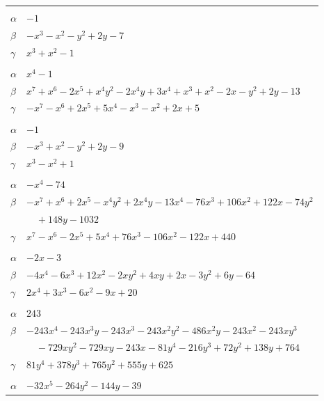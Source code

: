 \documentclass[11pt]{article}
\begin{document}
\begin{longtable}{@{}ll@{}}
\addlinespace[3pt]
\multicolumn{2}{@{}l}{$\{i,j\}=\{9,35\}$, $k_{ij}=2\cdot 7$}\\
$\alpha$ & $-1$\\
$\beta$ & $-x^{3}-x^{2}-y^{2}+2y-7$\\
$\gamma$ & $x^{3}+x^{2}-1$\\
\addlinespace[3pt]
\multicolumn{2}{@{}l}{$\{i,j\}=\{9,36\}$, $k_{ij}=2\cdot 3\cdot 5$}\\
$\alpha$ & $x^{4}-1$\\
$\beta$ & $x^{7}+x^{6}-2x^{5}+x^{4}y^{2}-2x^{4}y+3x^{4}+x^{3}+x^{2}-2x-y^{2}+2y-13$\\
$\gamma$ & $-x^{7}-x^{6}+2x^{5}+5x^{4}-x^{3}-x^{2}+2x+5$\\
\addlinespace[3pt]
\multicolumn{2}{@{}l}{$\{i,j\}=\{9,38\}$, $k_{ij}=2^{4}$}\\
$\alpha$ & $-1$\\
$\beta$ & $-x^{3}+x^{2}-y^{2}+2y-9$\\
$\gamma$ & $x^{3}-x^{2}+1$\\
\addlinespace[3pt]
\multicolumn{2}{@{}l}{$\{i,j\}=\{9,39\}$, $k_{ij}=2\cdot 3^{5}\cdot 5$}\\
$\alpha$ & $-x^{4}-74$\\
$\beta$ & $-x^{7}+x^{6}+2x^{5}-x^{4}y^{2}+2x^{4}y-13x^{4}-76x^{3}+106x^{2}+122x-74y^{2}$\\
 & $\quad +148y-1032$\\
$\gamma$ & $x^{7}-x^{6}-2x^{5}+5x^{4}+76x^{3}-106x^{2}-122x+440$\\
\addlinespace[3pt]
\multicolumn{2}{@{}l}{$\{i,j\}=\{9,41\}$, $k_{ij}=3\cdot 5\cdot 7$}\\
$\alpha$ & $-2x-3$\\
$\beta$ & $-4x^{4}-6x^{3}+12x^{2}-2xy^{2}+4xy+2x-3y^{2}+6y-64$\\
$\gamma$ & $2x^{4}+3x^{3}-6x^{2}-9x+20$\\
\addlinespace[3pt]
\multicolumn{2}{@{}l}{$\{i,j\}=\{10,12\}$, $k_{ij}=2^{3}\cdot 13$}\\
$\alpha$ & $243$\\
$\beta$ & $-243x^{4}-243x^{3}y-243x^{3}-243x^{2}y^{2}-486x^{2}y-243x^{2}-243xy^{3}$\\
 & $\quad -729xy^{2}-729xy-243x-81y^{4}-216y^{3}+72y^{2}+138y+764$\\
$\gamma$ & $81y^{4}+378y^{3}+765y^{2}+555y+625$\\
\addlinespace[3pt]
\multicolumn{2}{@{}l}{$\{i,j\}=\{10,23\}$, $k_{ij}=3\cdot 17$}\\
$\alpha$ & $-32x^{5}-264y^{2}-144y-39$\\

\end{longtable}
\end{document}
